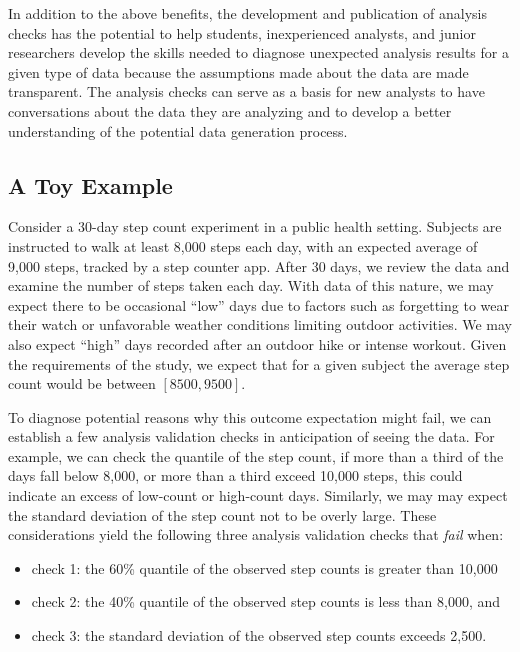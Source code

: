 \documentclass[
  12pt,
]{interact}
\providecommand{\tightlist}{%
  \setlength{\itemsep}{0pt}\setlength{\parskip}{0pt}}\usepackage{longtable,booktabs,array}
\begin{document}
In addition to the above benefits, the development and publication of
analysis checks has the potential to help students, inexperienced
analysts, and junior researchers develop the skills needed to diagnose
unexpected analysis results for a given type of data because the
assumptions made about the data are made transparent. The analysis
checks can serve as a basis for new analysts to have conversations about
the data they are analyzing and to develop a better understanding of the
potential data generation process.

\subsection{A Toy Example}\label{sec-toy}

Consider a 30-day step count experiment in a public health setting.
Subjects are instructed to walk at least 8,000 steps each day, with an
expected average of 9,000 steps, tracked by a step counter app. After 30
days, we review the data and examine the number of steps taken each day.
With data of this nature, we may expect there to be occasional ``low''
days due to factors such as forgetting to wear their watch or
unfavorable weather conditions limiting outdoor activities. We may also
expect ``high'' days recorded after an outdoor hike or intense workout.
Given the requirements of the study, we expect that for a given subject
the average step count would be between \([8500, 9500]\).

To diagnose potential reasons why this outcome expectation might fail,
we can establish a few analysis validation checks in anticipation of
seeing the data. For example, we can check the quantile of the step
count, if more than a third of the days fall below 8,000, or more than a
third exceed 10,000 steps, this could indicate an excess of low-count or
high-count days. Similarly, we may may expect the standard deviation of
the step count not to be overly large. These considerations yield the
following three analysis validation checks that \emph{fail} when:

\begin{itemize}
\tightlist
\item
  check 1: the 60\% quantile of the observed step counts is greater than
  10,000
\item
  check 2: the 40\% quantile of the observed step counts is less than
  8,000, and
\item
  check 3: the standard deviation of the observed step counts exceeds
  2,500.
\end{itemize}
\end{document}
